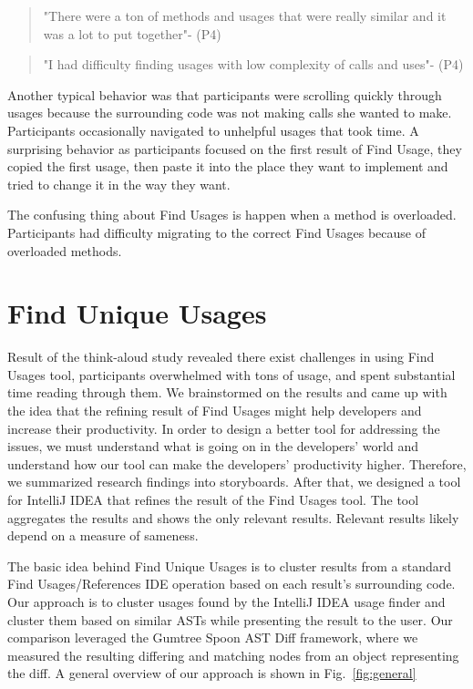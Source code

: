 \documentclass[conference]{IEEEtran}
\begin{document}
\begin{quote}"There were a ton of methods and usages that were really similar and it was a lot to put together"- (P4)\end{quote}
\begin{quote}"I had difficulty finding usages with low complexity of calls and uses"- (P4)\end{quote}

Another typical behavior was that participants were scrolling quickly through usages because the surrounding code was not making calls she wanted to make. Participants occasionally navigated to unhelpful usages that took time. A surprising behavior as participants focused on the first result of Find Usage, they copied the first usage, then paste it into the place they want to implement and tried to change it in the way they want.\par 

The confusing thing about Find Usages is happen when a method is overloaded. Participants had difficulty migrating to the correct Find Usages because of overloaded methods.

\section{Find Unique Usages}
Result of the think-aloud study revealed there exist challenges in using Find Usages tool, participants overwhelmed with tons of usage, and spent substantial time reading through them. We brainstormed on the results and came up with the idea that the refining result of Find Usages might help developers and increase their productivity. In order to design a better tool for addressing the issues, we must understand what is going on in the developers' world and understand how our tool can make the developers' productivity higher. Therefore, we summarized research findings into storyboards. After that, we designed a tool for IntelliJ IDEA that refines the result of the Find Usages tool. The tool aggregates the results and shows the only relevant results. Relevant results likely depend on a measure of sameness.\par
The basic idea behind Find Unique Usages is to cluster results from a standard Find Usages/References IDE operation based on each result's surrounding code. Our approach is to cluster usages found by the IntelliJ IDEA usage finder and cluster them based on similar ASTs while presenting the result to the user. Our comparison leveraged the Gumtree Spoon AST Diff framework, where we measured the resulting differing and matching nodes from an object representing the diff. A general overview of our approach is shown in Fig.~\ref{fig:general} 
\end{document}
